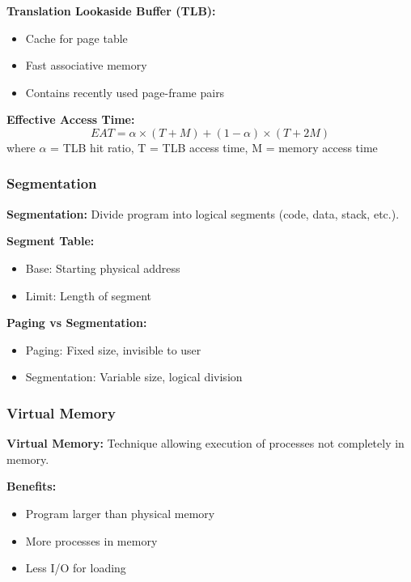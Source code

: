 \documentclass[11pt,a4paper]{article}
\begin{document}
\textbf{Translation Lookaside Buffer (TLB):}
\begin{itemize}
    \item Cache for page table
    \item Fast associative memory
    \item Contains recently used page-frame pairs
\end{itemize}

\begin{formulabox}
\textbf{Effective Access Time:}
\[
    EAT = \alpha \times (T + M) + (1-\alpha) \times (T + 2M)
\]
where $\alpha$ = TLB hit ratio, T = TLB access time, M = memory access time
\end{formulabox}

\subsubsection{Segmentation}

\begin{defbox}
\textbf{Segmentation:} Divide program into logical segments (code, data, stack, etc.).
\end{defbox}

\textbf{Segment Table:}
\begin{itemize}
    \item Base: Starting physical address
    \item Limit: Length of segment
\end{itemize}

\textbf{Paging vs Segmentation:}
\begin{itemize}
    \item Paging: Fixed size, invisible to user
    \item Segmentation: Variable size, logical division
\end{itemize}

\subsubsection{Virtual Memory}

\begin{defbox}
\textbf{Virtual Memory:} Technique allowing execution of processes not completely in memory.
\end{defbox}

\textbf{Benefits:}
\begin{itemize}
    \item Program larger than physical memory
    \item More processes in memory
    \item Less I/O for loading
\end{itemize}
\end{document}

